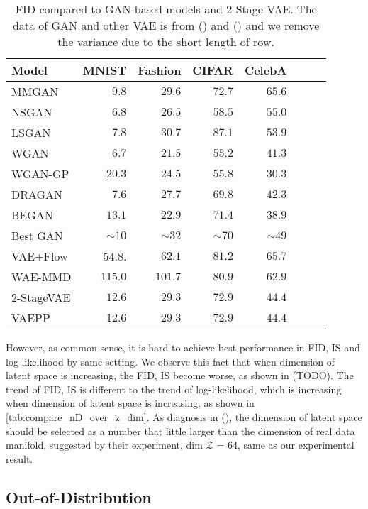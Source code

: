 \begin{table}[tb]
\centering
\begin{tabular}{lrrrrrrr}  
\toprule
Model & MNIST & Fashion & CIFAR & CelebA\\
\midrule
MMGAN & $9.8$ & $29.6$ & $72.7$ & $65.6$\\
NSGAN & $6.8$ & $26.5$ & $58.5$ & $55.0$\\
LSGAN & $7.8$ & $30.7$ & $87.1$ & $53.9$\\
WGAN  & $6.7$ & $21.5$ & $55.2$ & $41.3$\\
WGAN-GP & $20.3$ & $24.5$ & $55.8$ & $30.3$\\
DRAGAN  & $7.6$ & $27.7$ & $69.8$ & $42.3$\\
BEGAN  & $13.1$ & $22.9$ & $71.4$ & $38.9$\\
\midrule
Best GAN   & $\sim10$& $\sim32$&$\sim70$& $\sim49$\\
VAE+Flow   & $54.8$. & $62.1$  & $81.2$ & $65.7$\\
WAE-MMD    & $115.0$ & $101.7$ & $80.9$ & $62.9$\\
2-StageVAE & $12.6$  & $29.3$  & $72.9$ & $44.4$\\
VAEPP      & $12.6$  & $29.3$  & $72.9$ & $44.4$ \\
\bottomrule
\end{tabular}
\caption{FID compared to GAN-based models and 2-Stage VAE. The data of GAN and other VAE is from () and () and we remove the variance due to the short length of row. }
\label{tab:compare_FID}
\end{table}

However, as common sense, it is hard to achieve best performance in FID, IS and log-likelihood by same setting. We observe this fact that when dimension of latent space is increasing, the FID, IS become worse, as shown in (TODO). The trend of FID, IS is different to the trend of log-likelihood, which is increasing when dimension of latent space is increasing, as shown in \cref{tab:compare_nD_over_z_dim}. As diagnosis in (), the dimension of latent space should be selected as a number that little larger than the dimension of real data manifold, suggested by their experiment, dim $\mathcal{Z}$ = 64, same as our experimental result.  

\subsection{Out-of-Distribution}

